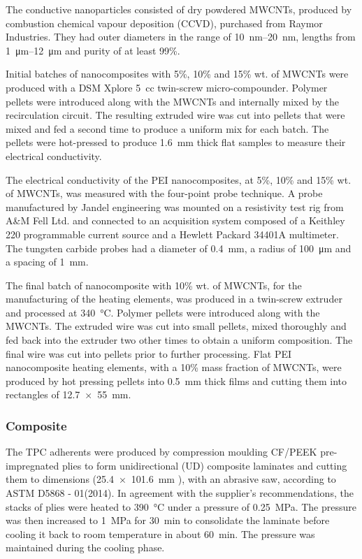 The conductive nanoparticles consisted of dry powdered MWCNTs, produced by combustion chemical vapour deposition (CCVD), purchased from Raymor Industries. 
They had outer diameters in the range of \SIrange{10}{20}{\nano\metre}, lengths from \SIrange{1}{12}{\micro\metre} and purity of at least 99\%.

Initial batches of nanocomposites with 5\%, 10\% and 15\% wt. of MWCNTs were produced with a DSM Xplore 5~cc twin-screw micro-compounder. 
Polymer pellets were introduced along with the MWCNTs and internally mixed by the recirculation circuit.
The resulting extruded wire was cut into pellets that were mixed and fed a second time to produce a uniform mix for each batch. 
The pellets were hot-pressed to produce \SI{1.6}{\mm} thick flat samples to measure their electrical conductivity.  

The electrical conductivity of the PEI nanocomposites, at 5\%, 10\% and 15\% wt. of MWCNTs, was measured with the four-point probe technique. 
A probe manufactured by Jandel engineering was mounted on a resistivity test rig from A\&M Fell Ltd. and connected to an acquisition system composed of a Keithley 220 programmable current source and a Hewlett Packard 34401A multimeter. 
The tungsten carbide probes had a diameter of \SI{0.4}{\mm}, a radius of \SI{100}{\um} and a spacing of \SI{1}{\mm}. 

The final batch of nanocomposite with 10\% wt. of MWCNTs, for the manufacturing of the heating elements, was produced in a twin-screw extruder and processed at \SI{340}{\celsius}. 
Polymer pellets were introduced along with the MWCNTs. 
The extruded wire was cut into small pellets, mixed thoroughly and fed back into the extruder two other times to obtain a uniform composition. 
The final wire was cut into pellets prior to further processing. 
Flat PEI nanocomposite heating elements, with a 10\% mass fraction of MWCNTs, were produced by hot pressing pellets into \SI{0.5}{\milli\metre} thick films and cutting them into rectangles of \SI{12.7 x 55}{\milli\metre}. 

\subsubsection{Composite}

The TPC adherents were produced by compression moulding CF/PEEK pre-impregnated plies to form unidirectional (UD) composite laminates and cutting them to dimensions (\SI{25.4 x 101.6}{\milli\metre} ), with an abrasive saw, according to ASTM D5868 - 01(2014). 
In agreement with the supplier’s recommendations, the stacks of plies were heated to \SI{390}{\celsius} under a pressure of \SI{0.25}{\MPa}. 
The pressure was then increased to \SI{1}{\MPa} for \SI{30}{\minute} to consolidate the laminate before cooling it back to room temperature in about \SI{60}{\minute}. 
The pressure was maintained during the cooling phase. 

